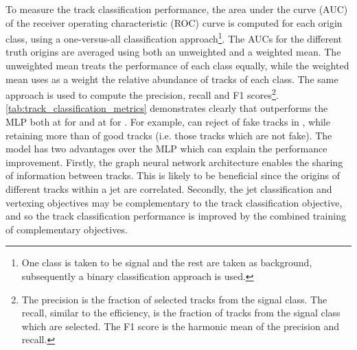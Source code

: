 To measure the track classification performance, the area under the curve (AUC) of the receiver operating characteristic (ROC) curve is computed for each origin class, using a one-versus-all classification approach\footnote{One class is taken to be signal and the rest are taken as background, subsequently a binary classification approach is used.}.
The AUCs for the different truth origins are averaged using both an unweighted and a weighted mean.
The unweighted mean treats the performance of each class equally, while the weighted mean uses as a weight the relative abundance of tracks of each class.
The same approach is used to compute the precision, recall and F1 scores\footnote{The precision is the fraction of selected tracks from the signal class. The recall, similar to the efficiency, is the fraction of tracks from the signal class which are selected. The F1 score is the harmonic mean of the precision and recall.}.
\cref{tab:track_classification_metrics} demonstrates clearly that \GNN outperforms the MLP both at \ttbarpt for \ttbarjets and at \Zprimept for \Zprimejets.
For example, \GNN can reject  of fake tracks in \ttbarjets, while retaining more than  of good tracks (i.e. those tracks which are not fake).
The \GNN model has two advantages over the MLP which can explain the performance improvement.
Firstly, the graph neural network architecture enables the sharing of information between tracks.
This is likely to be beneficial since the origins of different tracks within a jet are correlated.
Secondly, the jet classification and vertexing objectives may be complementary to the track classification objective, and so the track classification performance is improved by the combined training of complementary objectives.

